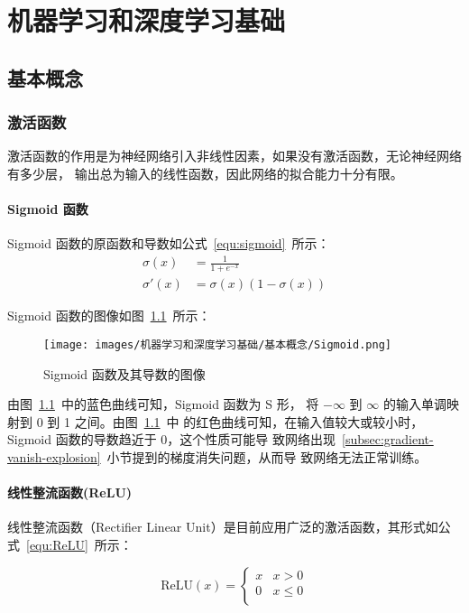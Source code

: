 \part{机器学习和深度学习基础}

\chapter{基本概念}

\section{激活函数}

激活函数的作用是为神经网络引入非线性因素，如果没有激活函数，无论神经网络有多少层，
输出总为输入的线性函数，因此网络的拟合能力十分有限。

\subsection{Sigmoid 函数}
\label{subsec:Sigmoid}

Sigmoid 函数的原函数和导数如公式~\ref{equ:sigmoid}~所示：
\begin{align}
  \label{equ:sigmoid}
  \sigma(x) & = \frac{1}{1 + e^{-x}} \\
  \sigma'(x) & = \sigma(x) (1-\sigma(x))
\end{align}

Sigmoid 函数的图像如图~\ref{fig:sigmoid}~所示：

\begin{figure}[ht]
  \centering
  \texttt{[image: images/机器学习和深度学习基础/基本概念/Sigmoid.png]}
  \caption{Sigmoid 函数及其导数的图像}
  \label{fig:sigmoid}
\end{figure}

由图~\ref{fig:sigmoid}~中的蓝色曲线可知，Sigmoid 函数为 S 形，
将 $-\infty$ 到 $\infty$ 的输入单调映射到 0 到 1 之间。由图~\ref{fig:sigmoid}~中
的红色曲线可知，在输入值较大或较小时，Sigmoid 函数的导数趋近于 0，这个性质可能导
致网络出现~\ref{subsec:gradient-vanish-explosion}~小节提到的梯度消失问题，从而导
致网络无法正常训练。

\subsection{线性整流函数(ReLU)}

线性整流函数（Rectifier Linear Unit）是目前应用广泛的激活函数，其形式如公
式~\ref{equ:ReLU}~所示：

\begin{equation}
  \label{equ:ReLU}
  \mathrm{ReLU}(x) = \left\{
    \begin{array}{lr}
      x & x > 0 \\
      0 & x \leq 0 \\
    \end{array}
  \right.
\end{equation}

